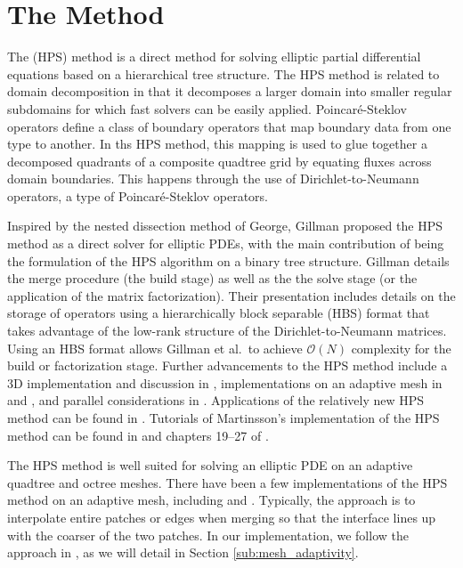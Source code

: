 \section{The \HPS Method}
\label{sec:hps}

The \HPS (HPS) method is a direct method for solving elliptic partial differential equations based on a hierarchical tree structure. The HPS method is related to domain decomposition in that it decomposes a larger domain into smaller regular subdomains for which fast solvers can be easily applied. Poincaré-Steklov operators \cite{quarteroni1991theory} define a class of boundary operators that map boundary data from one type to another. In ths HPS method, this mapping is used to glue together a decomposed quadrants of a composite quadtree grid by equating fluxes across domain boundaries. This happens through the use of Dirichlet-to-Neumann operators, a type of Poincaré-Steklov operators. 

Inspired by the nested dissection method of George, Gillman proposed the HPS method as a direct solver for elliptic PDEs, with the main contribution of \cite{gillman2014direct} being the formulation of the HPS algorithm on a binary tree structure. Gillman details the merge procedure (the build stage) as well as the the solve stage (or the application of the matrix factorization). Their presentation includes details on the storage of operators using a hierarchically block separable (HBS) format that takes advantage of the low-rank structure of the Dirichlet-to-Neumann matrices. Using an HBS format allows Gillman et al.\ to achieve $\mathcal{O}(N)$ complexity for the build or factorization stage. Further advancements to the HPS method include a 3D implementation and discussion in \cite{hao2016direct}, implementations on an adaptive mesh in \cite{babb2018accelerated} and \cite{geldermans2019adaptive}, and parallel considerations in \cite{beams2020parallel}. Applications of the relatively new HPS method can be found in \cite{fortunato2020ultraspherical}. Tutorials of Martinsson's implementation of the HPS method can be found in \cite{martinsson2015hierarchical} and chapters 19--27 of \cite{martinsson2019fast}.

The HPS method is well suited for solving an elliptic PDE on an adaptive quadtree and octree meshes. There have been a few implementations of the HPS method on an adaptive mesh, including \cite{babb2018accelerated} and \cite{geldermans2019adaptive}. Typically, the approach is to interpolate entire patches or edges when merging so that the interface lines up with the coarser of the two patches. In our implementation, we follow the approach in \cite{babb2018accelerated}, as we will detail in Section \ref{sub:mesh_adaptivity}.

